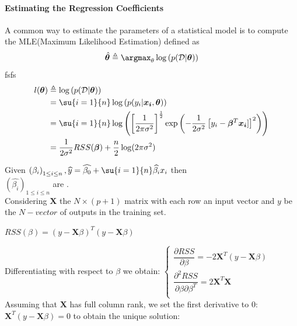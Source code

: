 \paragraph{Estimating the Regression Coefficients}
A common way to estimate the parameters of a statistical model is to compute
the MLE(Maximum Likelihood Estimation) defined as 
$$\hat{\bm{\theta}} \triangleq \displaystyle \argmax_{\theta} \log\left(
p(\mathcal{D}|\bm{\theta})\right)$$
fsfs
\begin{align*}
    l(\bm{\theta}) &\triangleq \log\left(p(\mathcal{D}|\bm{\theta})\right)\\
                   &=\su{i=1}{n}\log\left(p(y_{i}|\bm{x_{i}}, \bm{\theta})\right)\\
                   &= \su{i=1}{n}\log\left(
                       \left[\dfrac{1}{2\pi\sigma^{2}}\right]^{\frac{1}{2}}
                       \exp\left(-\dfrac{1}{2\sigma^{2}}\left[y_{i} - \bm{\beta}^{T}
                       \bm{x_{i}}]\right]^{2}\right)\right)\\ 
                   &= \dfrac{1}{2\sigma^{2}}RSS(\bm{\beta}) +
                   \dfrac{n}{2}\log(2\pi\sigma^{2})
\end{align*}

Given $\left(\beta_{i}\right)_{1\leq i\leq n},\widehat{y}=\widehat{\beta_{0}}+
\su{{i=1}}{n}\widehat{\beta_{i}}x_{i}$ then 
\\$\left(\widehat{\beta_{i}}\right)_{1\leq i\leq n}$ are .\\
Considering $\bm{X}$ the $N\times (p+1)$ matrix with each row an input
vector and $y$ be the $N-vector$ of outputs in the training set.
\begin{center}
	$RSS(\beta)=(y-\bm{X}\beta)^{T}(y-\bm{X}\beta)$
\end{center}
Differentiating with respect to $\beta$ we obtain:
$
\begin{cases}
	\dfrac{\partial RSS}{\partial\beta}=-2\bm{X}^{T}(y-\bm{X}\beta)\\
	\dfrac{\partial^{2} RSS}{\partial\beta\partial\beta^{T}}=2\bm{X}^{T}\bm{X}\\
\end{cases}
$\\
Assuming that $\bm{X}$ has full column rank, we set the first 
derivative to 0:\\ $\bm{X}^{T}(y-\bm{X}\beta)=0$ to obtain the unique
solution:

